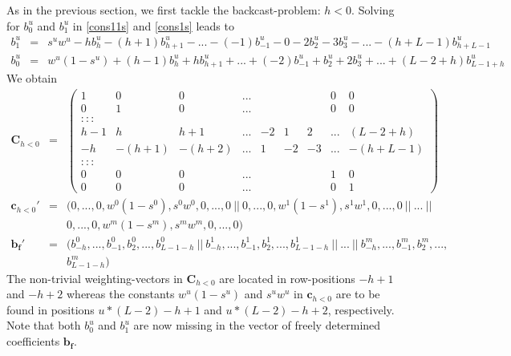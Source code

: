 \documentclass[a4paper]{book}
\begin{document}
As in the previous section, we first tackle the backcast-problem: $h<0$. Solving for $b_0^u$ and $b_1^u$ in \ref{cons11s} and \ref{cons1s} leads to
\begin{eqnarray*}%
b_{1}^u&=&s^uw^u-hb_{h}^u-(h+1)b_{h+1}^u-...-(-1)b_{-1}^u-0-2b_{2}^u-3b_{3}^u-...-(h+L-1)b_{h+L-1}^u\nonumber\\
b_{0}^u&=&w^u(1-s^u)+(h-1)b_{h}^u+hb_{h+1}^u+...+(-2)b_{-1}^u+b_{2}^u+2b_3^u+...+(L-2+h)b_{L-1+h}^u\nonumber%
\end{eqnarray*}
We obtain
\begin{eqnarray}\label{cons77s}
\mathbf{C}_{h<0}&=&\left(\begin{array}{ccccccccc}
1&0&0&...&&&&0&0\\
0&1&0&...&&&&0&0\\
:::\\
h-1&h&h+1&...&-2&1&2&...&(L-2+h)\\
-h&-(h+1)&-(h+2)&...&1&-2&-3&...&-(h+L-1)\\
:::\\
0&0&0&...&&&&1&0\\
0&0&0&...&&&&0&1
\end{array}\right)\\
\mathbf{c}_{h<0}'&=&(0,...,0,w^0(1-s^0),s^0w^0,0,...,0~||~0,...,0,w^1(1-s^1),s^1w^1,0,...,0~||~...~||\\
&&0,...,0,w^m(1-s^m),s^mw^m,0,...,0)\nonumber\\
\mathbf{b_f}'&=&(b_{-h}^0,...,b_{-1}^0,b_2^0,...,b_{L-1-h}^0~||~b_{-h}^1,...,b_{-1}^1,b_2^1,...,b_{L-1-h}^1~||~...~||~b_{-h}^m,...,b_{-1}^m,b_2^m,...,\\
&&b_{L-1-h}^m)\nonumber
\end{eqnarray}
The non-trivial weighting-vectors in $\mathbf{C}_{h<0}$ are located in row-positions $-h+1$ and $-h+2$ whereas the constants $w^u(1-s^u)$ and $s^uw^u$ in $\mathbf{c}_{h<0}$ are to be found in positions $u*(L-2)-h+1$ and $u*(L-2)-h+2$, respectively. Note that both $b_0^u$ and $b_1^u$ are now missing in the vector of freely determined coefficients $\mathbf{b_f}$. \\
\end{document}
